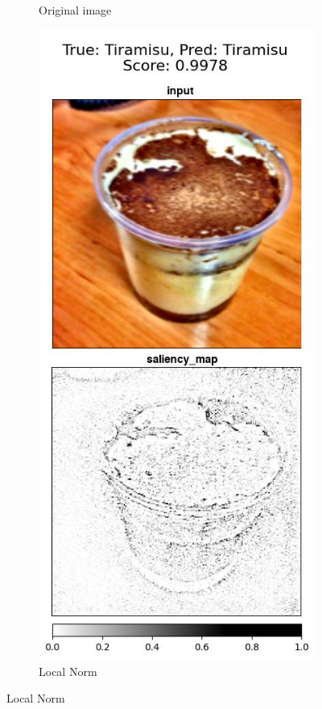 \begin{figure}
\begin{subfigure}{.2\textwidth}
    \caption{Original image}\label{fig:original-tiramisu}
\end{subfigure}
 \begin{subfigure}{.2\textwidth}
    \centering
    \includegraphics[width=\textwidth]{results/augment-img/19-2-98-normalize_local 8,10-Tiramisu-Tiramisu_vert.jpg}
    \caption{Local Norm}\label{fig:norm-tiramisu}
\end{subfigure}


\end{figure}
